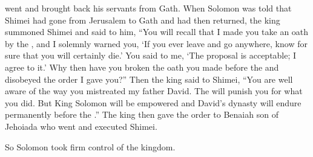 {went
and brought
back his servants
from Gath.
When Solomon
was told
that
Shimei
had gone
from Jerusalem
to Gath
and had then returned,
the king
summoned
Shimei
and said
to him,
“You will recall that I
made you take an oath
by the
{},
and I solemnly
warned
you, ‘If you ever
leave
and go
anywhere,
know
for sure
that
you will certainly
die.’
You said
to me,
‘The proposal is
acceptable; I agree
to it.’
Why
then have
you broken
the oath
you made before the
{}
and disobeyed
the order I gave you?”
Then the king
said
to
Shimei,
“You
are well aware
of the way
you mistreated
my father
David.
The
{}
will punish you for what you did.
But King
Solomon
will be empowered
and David’s
dynasty
will
endure
permanently
before
the {}.”
The king
then gave the order
to Benaiah
son
of Jehoiada
who went
and executed
Shimei.

\par }{\PP So Solomon
took firm
control
of the kingdom.

}

